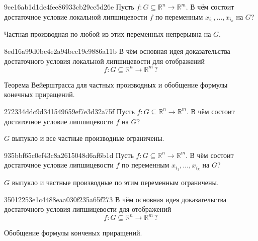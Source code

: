 \begin{note}{9ce16ab1d1de4fee86933cb29ce5d26e}
    Пусть \({ f : G \subseteq \mathbb R^{n} \to \mathbb R^{m} }\).
    В чём состоит достаточное условие локальной липшицевости \({ f }\) по переменным \({ x_{i_1}, \ldots, x_{i_k} }\) на \({ G }\)?

    \begin{cloze}{1}
        Частная производная по любой из этих переменных непрерывна на \({ G }\).
    \end{cloze}
\end{note}

\begin{note}{8ed16a99d0bc4e2a94bec19c9886a11b}
    В чём основная идея доказательства достаточного условия локальной липшицевости для отображений
    \[
        f : G \subseteq \mathbb R^{n} \to \mathbb R^{m}\,?
    \]

    \begin{cloze}{1}
        Теорема Вейерштрасса для частных производных и обобщение формулы конечных приращений.
    \end{cloze}
\end{note}

\begin{note}{272334ddc9d341549659ef7e3d32a75f}
    Пусть \({ f : G \subseteq \mathbb R^{n} \to \mathbb R^{m} }\).
    В чём состоит достаточное условие липшицевости \({ f }\) на \({ G }\)?

    \begin{cloze}{1}
        \({ G }\) выпукло и все частные производные ограничены.
    \end{cloze}
\end{note}

\begin{note}{935bbf65c0ef43c8a2615048d6af6b1d}
    Пусть \({ f : G \subseteq \mathbb R^{n} \to \mathbb R^{m} }\).
    В чём состоит достаточное условие липшицевости \({ f }\) по переменным \({ x_{i_1}, \ldots, x_{i_k} }\) на \({ G }\)?

    \begin{cloze}{1}
        \({ G }\) выпукло и частные производные по этим переменным ограничены.
    \end{cloze}
\end{note}

\begin{note}{35012253e1c4488eaa030f235a65f273}
    В чём основная идея доказательства достаточного условия липшицевости для отображений
    \[
        f : G \subseteq \mathbb R^{n} \to \mathbb R^{m}\,?
    \]

    \begin{cloze}{1}
        Обобщение формулы конченых приращений.
    \end{cloze}
\end{note}


